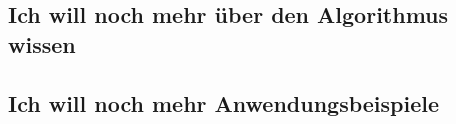 \documentclass[12pt]{article}
\begin{document}
\subsection{Ich will noch mehr über den Algorithmus wissen}

\subsection{Ich will noch mehr Anwendungsbeispiele}
\end{document}

